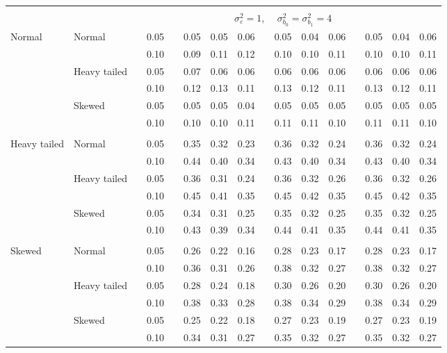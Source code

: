 \documentclass{article} %
\begin{document}
\begin{table}[ht]
\begin{scriptsize}
\begin{center}
\begin{tabular}{ll p{.1cm} c p{.1cm} rrr p{.1cm} rrr p{.1cm} rrr}
&&&&&&&&&&&&&&&\\
& && && \multicolumn{9}{c}{$\sigma_{\varepsilon}^2 = 1$, \ \ $\sigma_{b_0}^2 = \sigma_{b_1}^2 = 4$} \\ \cline{6-16}
\rowcolor{gray!20}Normal       & Normal       && 0.05 &&   0.05 & 0.05 & 0.06 && 0.05 & 0.04 & 0.06 && 0.05 & 0.04 & 0.06 \\ 
\rowcolor{gray!20}             &              && 0.10 &&   0.09 & 0.11 & 0.12 && 0.10 & 0.10 & 0.11 && 0.10 & 0.10 & 0.11 \\ 
\rowcolor{gray!20}             & Heavy tailed && 0.05 &&   0.07 & 0.06 & 0.06 && 0.06 & 0.06 & 0.06 && 0.06 & 0.06 & 0.06 \\ 
\rowcolor{gray!20}             &              && 0.10 &&   0.12 & 0.13 & 0.11 && 0.13 & 0.12 & 0.11 && 0.13 & 0.12 & 0.11 \\ 
\rowcolor{gray!20}             & Skewed       && 0.05 &&   0.05 & 0.05 & 0.04 && 0.05 & 0.05 & 0.05 && 0.05 & 0.05 & 0.05 \\ 
\rowcolor{gray!20}             &              && 0.10 &&   0.10 & 0.10 & 0.11 && 0.11 & 0.11 & 0.10 && 0.11 & 0.11 & 0.10 \\ 
             &&&&&&&&&&&&&&&\\
Heavy tailed & Normal       && 0.05 &&   0.35 & 0.32 & 0.23 && 0.36 & 0.32 & 0.24 && 0.36 & 0.32 & 0.24 \\ 
             &              && 0.10 &&   0.44 & 0.40 & 0.34 && 0.43 & 0.40 & 0.34 && 0.43 & 0.40 & 0.34 \\ 
             & Heavy tailed && 0.05 &&   0.36 & 0.31 & 0.24 && 0.36 & 0.32 & 0.26 && 0.36 & 0.32 & 0.26 \\ 
             &              && 0.10 &&   0.45 & 0.41 & 0.35 && 0.45 & 0.42 & 0.35 && 0.45 & 0.42 & 0.35 \\ 
             & Skewed       && 0.05 &&   0.34 & 0.31 & 0.25 && 0.35 & 0.32 & 0.25 && 0.35 & 0.32 & 0.25 \\ 
             &              && 0.10 &&   0.43 & 0.39 & 0.34 && 0.44 & 0.41 & 0.35 && 0.44 & 0.41 & 0.35 \\ 
             &&&&&&&&&&&&&&&\\
Skewed       & Normal       && 0.05 &&   0.26 & 0.22 & 0.16 && 0.28 & 0.23 & 0.17 && 0.28 & 0.23 & 0.17 \\ 
             &              && 0.10 &&   0.36 & 0.31 & 0.26 && 0.38 & 0.32 & 0.27 && 0.38 & 0.32 & 0.27 \\ 
             & Heavy tailed && 0.05 &&   0.28 & 0.24 & 0.18 && 0.30 & 0.26 & 0.20 && 0.30 & 0.26 & 0.20 \\ 
             &              && 0.10 &&   0.38 & 0.33 & 0.28 && 0.38 & 0.34 & 0.29 && 0.38 & 0.34 & 0.29 \\ 
             & Skewed       && 0.05 &&   0.25 & 0.22 & 0.18 && 0.27 & 0.23 & 0.19 && 0.27 & 0.23 & 0.19 \\ 
             &              && 0.10 &&   0.34 & 0.31 & 0.27 && 0.35 & 0.32 & 0.27 && 0.35 & 0.32 & 0.27 \\ 



\end{tabular}
\end{center}
\end{scriptsize}
\end{table}
\end{document}
